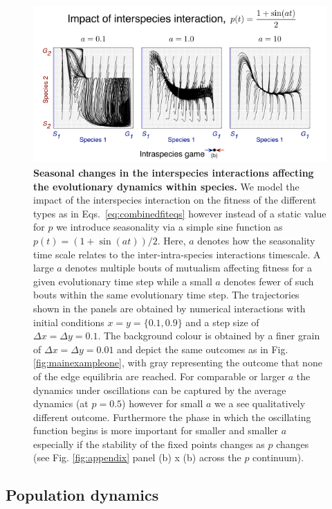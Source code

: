 \documentclass[12pt]{article}
\begin{document}
\begin{figure}
\begin{center}
\includegraphics[width=\columnwidth]{Figures/oscillating_p_reduced.pdf}
\caption{\small{
\textbf{Seasonal changes in the interspecies interactions affecting the evolutionary dynamics within species.}
We model the impact of the interspecies interaction on the fitness of the different types as in Eqs.~\ref{eq:combinedfiteqs} however instead of a static value for $p$ we introduce seasonality via a simple sine function as $p(t) = (1+\sin(at))/2$.
Here, $a$ denotes how the seasonality time scale relates to the inter-intra-species interactions timescale.
A large $a$ denotes multiple bouts of mutualism affecting fitness for a given evolutionary time step while a small $a$ denotes fewer of such bouts within the same evolutionary time step.
The trajectories shown in the panels are obtained by numerical interactions with initial conditions $x = y = \{0.1,0.9\}$ and a step size of $\Delta x = \Delta y = 0.1$.
The background colour is obtained by a finer grain of $\Delta x = \Delta y = 0.01$ and depict the same outcomes as in Fig. \ref{fig:mainexampleone}, with gray representing the outcome that none of the edge equilibria are reached.
For comparable or larger $a$ the dynamics under oscillations can be captured by the average dynamics (at $p = 0.5$) however for small $a$ we a see qualitatively different outcome.
Furthermore the phase in which the oscillating function begins is more important for smaller and smaller $a$ especially if the stability of the fixed points changes as $p$ changes (see Fig. \ref{fig:appendix} panel (b) x (b) across the $p$ continuum).
 }
\label{fig:oscillations}
}
\end{center}
\end{figure}


\subsection{Population dynamics}
\end{document}
